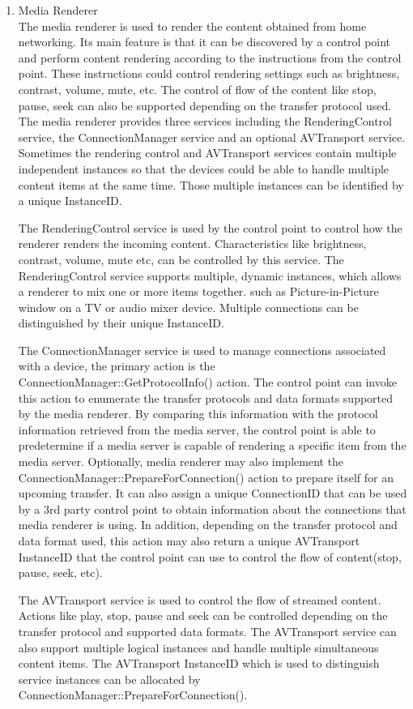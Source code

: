 \begin{enumerate}
\item Media Renderer \\ 
The media renderer is used to render the content obtained from home 
networking. Its main feature is that it can be discovered by a control point and perform content rendering according to the instructions from the control point. These instructions could control rendering settings such as brightness, contrast, volume, mute, etc. The control of flow of the content like stop, pause, seek can also be supported depending on the transfer protocol used. The media 
renderer provides three services including the RenderingControl service, the ConnectionManager 
service and an optional AVTransport service. Sometimes the rendering control and 
AVTransport services contain multiple independent instances so that the devices 
could be able to handle multiple content items at the same time. Those multiple 
instances can be identified by a unique InstanceID. 

The RenderingControl service is used by the control point to control how the renderer 
renders the incoming content. Characteristics like brightness, contrast, 
volume, mute etc, can be controlled by this service. The RenderingControl service 
supports multiple, dynamic instances, which allows a renderer to mix one or 
more items together. such as Picture-in-Picture window on a TV or audio mixer 
device. Multiple connections can be distinguished by their unique InstanceID. 

The ConnectionManager service is used to manage connections associated with a 
device, the primary action is the ConnectionManager::GetProtocolInfo() action. 
The control point can invoke this action to enumerate the transfer protocols and 
data formats supported by the media renderer. By comparing this information with 
the protocol information retrieved from the media server, the control point is able to 
predetermine if a media server is capable of rendering a specific item from 
the media server. Optionally, media renderer may also implement the
ConnectionManager::PrepareForConnection() action to prepare itself for an 
upcoming transfer. It can also assign a unique ConnectionID that can be used by 
a 3rd party control point to obtain information about the connections that media 
renderer is using. In addition, depending on the transfer protocol and data 
format used, this action may also return a unique AVTransport InstanceID that the control 
point can use to control the flow of content(stop, pause, seek, etc). 

The AVTransport service is used to control the flow of streamed content. Actions 
like play, stop, pause and seek can be controlled depending on the transfer 
protocol and supported data formats. The AVTransport service can also support 
multiple logical instances and handle multiple simultaneous content items. The 
AVTransport InstanceID which is used to distinguish service instances can be 
allocated by ConnectionManager::PrepareForConnection(). 


\end{enumerate}
